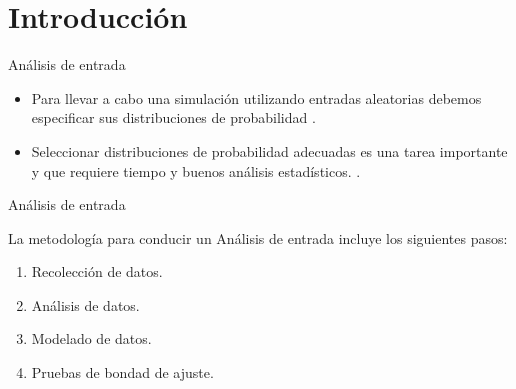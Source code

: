 \section{Introducción}

\begin{frame}{Análisis de entrada}
    \begin{itemize}
        \item Para llevar a cabo una simulación utilizando entradas aleatorias debemos especificar sus distribuciones de probabilidad \cite{LK}.
        \item Seleccionar distribuciones de probabilidad adecuadas es una tarea importante y que requiere tiempo y buenos análisis estadísticos. \cite{BCN}.
    \end{itemize}
\end{frame}

\begin{frame}{Análisis de entrada}

    La metodología para conducir un Análisis de entrada incluye los siguientes pasos:
    \begin{enumerate}
        \item Recolección de datos.
        \item Análisis de datos.
        \item Modelado de datos.
        \item Pruebas de bondad de ajuste.
    \end{enumerate}
\end{frame}